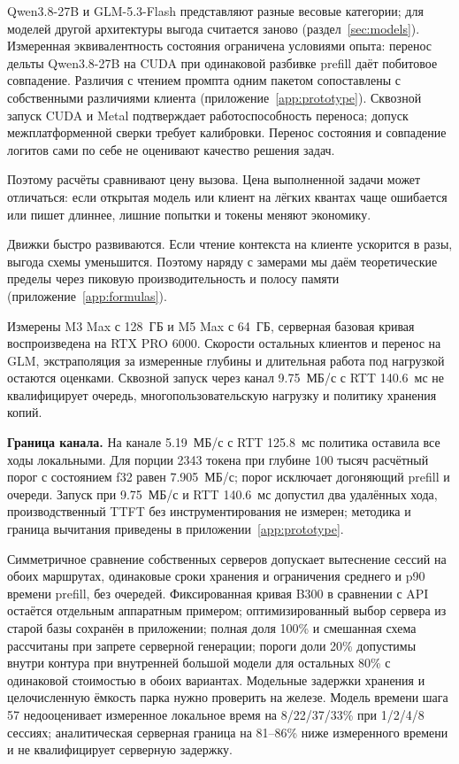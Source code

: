 Qwen3.8-27B и GLM-5.3-Flash представляют разные весовые категории; для моделей другой
архитектуры выгода считается заново (раздел~\ref{sec:models}). Измеренная эквивалентность состояния
ограничена условиями опыта: перенос дельты Qwen3.8-27B на CUDA при одинаковой разбивке prefill
даёт побитовое совпадение. Различия с чтением промпта
одним пакетом сопоставлены с собственными различиями клиента (приложение~\ref{app:prototype}).
Сквозной запуск CUDA и Metal подтверждает работоспособность переноса; допуск межплатформенной
сверки требует калибровки. Перенос состояния и совпадение логитов сами по себе не оценивают качество решения задач.

Поэтому расчёты сравнивают цену вызова. Цена выполненной задачи может отличаться: если открытая
модель или клиент на лёгких квантах чаще ошибается или пишет длиннее, лишние попытки и токены меняют экономику.

Движки быстро развиваются. Если чтение контекста на клиенте ускорится в разы, выгода схемы уменьшится. Поэтому
наряду с замерами мы даём теоретические пределы через пиковую производительность и полосу памяти
(приложение~\ref{app:formulas}).

Измерены M3 Max с 128~ГБ и M5 Max с 64~ГБ, серверная базовая кривая воспроизведена
на RTX PRO 6000. Скорости остальных клиентов и перенос на GLM, экстраполяция
за измеренные глубины и длительная работа под нагрузкой остаются оценками. Сквозной запуск через
канал 9.75~МБ/с с RTT 140.6~мс не квалифицирует очередь, многопользовательскую нагрузку и политику хранения копий.

\textbf{Граница канала.} На канале 5.19~МБ/с с RTT 125.8~мс политика оставила все ходы локальными.
Для порции 2343 токена при глубине 100 тысяч расчётный порог с состоянием f32 равен 7.905~МБ/с;
порог исключает догоняющий prefill и очереди. Запуск при 9.75~МБ/с и RTT 140.6~мс допустил два удалённых хода,
производственный TTFT без инструментирования не измерен; методика и граница вычитания приведены в приложении~\ref{app:prototype}.

Симметричное сравнение собственных серверов допускает вытеснение сессий на обоих маршрутах,
одинаковые сроки хранения и ограничения среднего и p90 времени prefill, без очередей.
Фиксированная кривая B300 в сравнении с API остаётся отдельным аппаратным примером;
оптимизированный выбор сервера из старой базы сохранён в приложении; полная доля 100\% и смешанная схема рассчитаны при запрете серверной генерации;
пороги доли 20\% допустимы внутри контура при внутренней большой модели для остальных 80\%
с одинаковой стоимостью в обоих вариантах.
Модельные задержки хранения и целочисленную ёмкость парка нужно проверить на железе.
Модель времени шага 57 недооценивает измеренное локальное время на 8/22/37/33\% при 1/2/4/8 сессиях;
аналитическая серверная граница на 81--86\% ниже измеренного времени и не квалифицирует серверную задержку.
